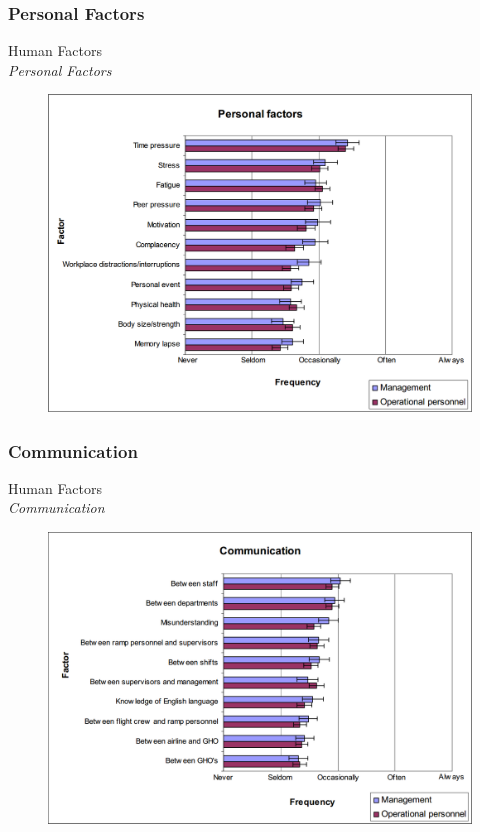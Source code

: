 \subsubsection{Personal Factors}
\begin{frame}{Human Factors\\\textit{Personal Factors}}{}
	\begin{figure}[H]
	\centering
	\includegraphics[width=\textwidth]{Grafik/PersonalFactors}
\end{figure}
\end{frame}

\subsubsection{Communication}
\begin{frame}{Human Factors\\\textit{Communication}}{}
	\begin{figure}[H]
	\centering
	\includegraphics[width=\textwidth]{Grafik/CommunicationalFactors}
\end{figure}
\end{frame}

